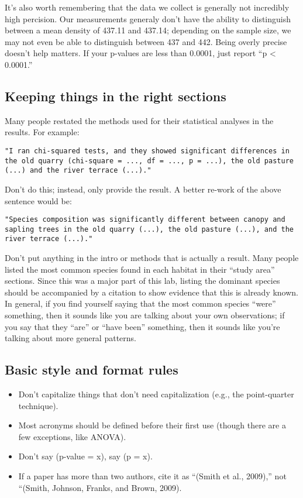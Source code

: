 \documentclass[]{book}
\providecommand{\tightlist}{%
  \setlength{\itemsep}{0pt}\setlength{\parskip}{0pt}}
\begin{document}
It's also worth remembering that the data we collect is generally not
incredibly high percision. Our measurements generaly don't have the
ability to distinguish between a mean density of 437.11 and 437.14;
depending on the sample size, we may not even be able to distinguish
between 437 and 442. Being overly precise doesn't help matters. If your
p-values are less than 0.0001, just report ``p \textless{} 0.0001.''

\subsection{Keeping things in the right
sections}\label{keeping-things-in-the-right-sections}

Many people restated the methods used for their statistical analyses in
the results. For example:

\begin{verbatim}
"I ran chi-squared tests, and they showed significant differences in the old quarry (chi-square = ..., df = ..., p = ...), the old pasture (...) and the river terrace (...)." 
\end{verbatim}

Don't do this; instead, only provide the result. A better re-work of the
above sentence would be:

\begin{verbatim}
"Species composition was significantly different between canopy and sapling trees in the old quarry (...), the old pasture (...), and the river terrace (...)."
\end{verbatim}

Don't put anything in the intro or methods that is actually a result.
Many people listed the most common species found in each habitat in
their ``study area'' sections. Since this was a major part of this lab,
listing the dominant species should be accompanied by a citation to show
evidence that this is already known. In general, if you find yourself
saying that the most common species ``were'' something, then it sounds
like you are talking about your own observations; if you say that they
``are'' or ``have been'' something, then it sounds like you're talking
about more general patterns.

\subsection{Basic style and format
rules}\label{basic-style-and-format-rules}

\begin{itemize}
\tightlist
\item
  Don't capitalize things that don't need capitalization (e.g., the
  point-quarter technique).
\item
  Most acronyms should be defined before their first use (though there
  are a few exceptions, like ANOVA).
\item
  Don't say (p-value = x), say (p = x).
\item
  If a paper has more than two authors, cite it as ``(Smith et al.,
  2009),'' not ``(Smith, Johnson, Franks, and Brown, 2009).
\end{itemize}
\end{document}
